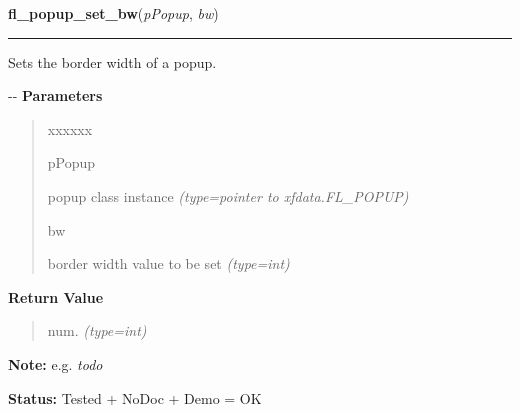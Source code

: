 \hspace{.8\funcindent}\begin{boxedminipage}{\funcwidth}

    \raggedright \textbf{fl\_popup\_set\_bw}(\textit{pPopup}, \textit{bw})

    \vspace{-1.5ex}

    \rule{\textwidth}{0.5\fboxrule}
\setlength{\parskip}{2ex}

Sets the border width of a popup.

-{}-
\setlength{\parskip}{1ex}
      \textbf{Parameters}
      \vspace{-1ex}

      \begin{quote}
        \begin{Ventry}{xxxxxx}

          \item[pPopup]


popup class instance
            {\it (type=pointer to xfdata.FL\_POPUP)}

          \item[bw]


border width value to be set
            {\it (type=int)}

        \end{Ventry}

      \end{quote}

      \textbf{Return Value}
    \vspace{-1ex}

      \begin{quote}

num.
      {\it (type=int)}

      \end{quote}

\textbf{Note:} 
e.g. \emph{todo}


\textbf{Status:} 
Tested + NoDoc + Demo = OK


    \end{boxedminipage}

    \label{xformslib:flpopup:fl_popup_get_color}

    \vspace{0.5ex}


